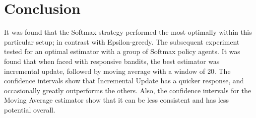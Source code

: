 \documentclass[11pt]{article}
\begin{document}
\section*{\LARGE Conclusion}
It was found that the Softmax strategy performed the most optimally within this particular setup; in contrast with Epsilon-greedy. The subsequent experiment tested for an optimal estimator with a group of Softmax policy agents. It was found that when faced with responsive bandits, the best estimator was incremental update, followed by moving average with a window of 20. The confidence intervals show that Incremental Update has a quicker response, and occasionally greatly outperforms the others. Also, the confidence intervals for the Moving Average estimator show that it can be less consistent and has less potential overall.

\nocite{antonacopoulos_pattern_2025}
\nocite{nandhini_fractal_2025}
\nocite{berger-tal_exploration-exploitation_2014}
\nocite{bubeck_regret_2012}
\nocite{sutton_reinforcement_nodate}
\nocite{wang_exploration_2019}
\printbibliography
\end{document}
